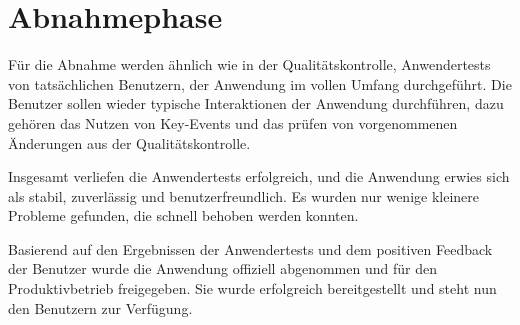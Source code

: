 \section{Abnahmephase} 
\label{sec:Abnahmephase}


Für die Abnahme werden ähnlich wie in der Qualitätskontrolle, Anwendertests von tatsächlichen Benutzern, der Anwendung im vollen Umfang durchgeführt.
Die Benutzer sollen wieder typische Interaktionen der Anwendung durchführen, dazu gehören das Nutzen von Key-Events und das prüfen von vorgenommenen Änderungen aus der Qualitätskontrolle.


Insgesamt verliefen die Anwendertests erfolgreich, und die Anwendung erwies sich als stabil, zuverlässig und benutzerfreundlich.
Es wurden nur wenige kleinere Probleme gefunden, die schnell behoben werden konnten.

Basierend auf den Ergebnissen der Anwendertests und dem positiven Feedback der Benutzer wurde die Anwendung offiziell abgenommen und für den Produktivbetrieb freigegeben.
Sie wurde erfolgreich bereitgestellt und steht nun den Benutzern zur Verfügung.

